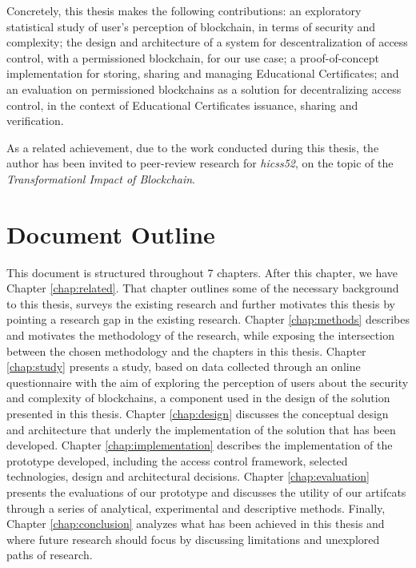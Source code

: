 Concretely, this thesis makes the following contributions: an exploratory statistical study of user's perception of blockchain, in terms of security and complexity; the design and architecture of a system for descentralization of access control, with a permissioned blockchain, for our use case; a proof-of-concept implementation for storing, sharing and managing Educational Certificates; and an evaluation on permissioned blockchains as a solution for decentralizing access control, in the context of Educational Certificates issuance, sharing and verification.

As a related achievement, due to the work conducted during this thesis, the author has been invited to peer-review research for \textit{\glsdesc{hicss52}}, on the topic of the \textit{Transformationl Impact of Blockchain}.

\section{Document Outline}

This document is structured throughout 7 chapters. After this chapter, we have Chapter \ref{chap:related}. That chapter outlines some of the necessary background to this thesis, surveys the existing research and further motivates this thesis by pointing a research gap in the existing research. Chapter \ref{chap:methods} describes and motivates the methodology of the research, while exposing the intersection between the chosen methodology and the chapters in this thesis. Chapter \ref{chap:study} presents a study, based on data collected through an online questionnaire with the aim of exploring the perception of users about the security and complexity of blockchains, a component used in the design of the solution presented in this thesis. Chapter \ref{chap:design} discusses the conceptual design and architecture that underly the implementation of the solution that has been developed. Chapter \ref{chap:implementation} describes the implementation of the prototype developed, including the access control framework, selected technologies, design and architectural decisions. Chapter \ref{chap:evaluation} presents the evaluations of our prototype and discusses the utility of our artifcats through a series of analytical, experimental and descriptive methods. Finally, Chapter \ref{chap:conclusion} analyzes what has been achieved in this thesis and where future research should focus by discussing limitations and unexplored paths of research.
